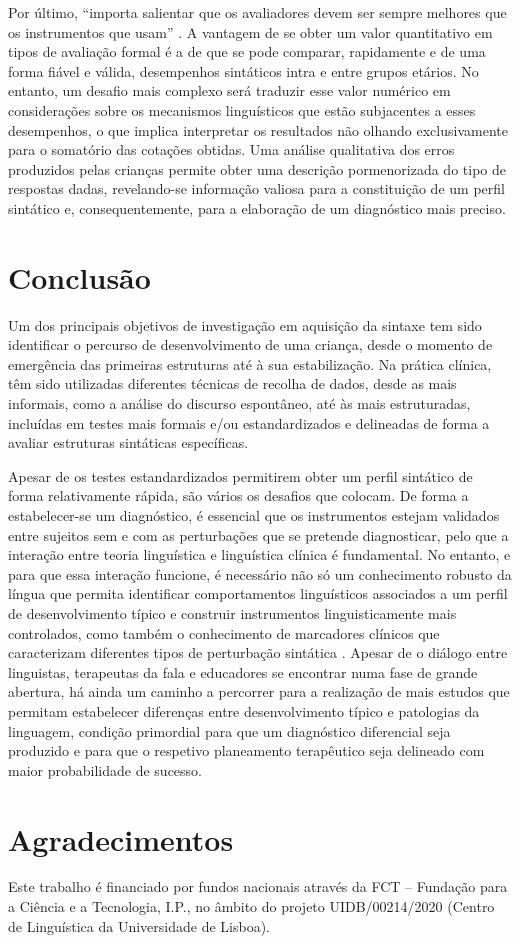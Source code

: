 \documentclass[output=paper,colorlinks,citecolor=brown,booklanguage=portuguese]{langscibook}
\begin{document}
Por último, “importa salientar que os avaliadores devem ser sempre melhores que os instrumentos que usam” \citep[215]{Almeida2008}. A vantagem de se obter um valor quantitativo em tipos de avaliação formal é a de que se pode comparar, rapidamente e de uma forma fiável e válida, desempenhos sintáticos intra e entre grupos etários. No entanto, um desafio mais complexo será traduzir esse valor numérico em considerações sobre os mecanismos linguísticos que estão subjacentes a esses desempenhos, o que implica interpretar os resultados não olhando exclusivamente para o somatório das cotações obtidas. Uma análise qualitativa dos erros produzidos pelas crianças permite obter uma descrição pormenorizada do tipo de respostas dadas, revelando-se informação valiosa para a constituição de um perfil sintático e, consequentemente, para a elaboração de um diagnóstico mais preciso.

\section{Conclusão}
Um dos principais objetivos de investigação em aquisição da sintaxe tem sido identificar o percurso de desenvolvimento de uma criança, desde o momento de emergência das primeiras estruturas até à sua estabilização. Na prática clínica, têm sido utilizadas diferentes técnicas de recolha de dados, desde as mais informais, como a análise do discurso espontâneo, até às mais estruturadas, incluídas em testes mais formais e/ou estandardizados e delineadas de forma a avaliar estruturas sintáticas específicas. 

Apesar de os testes estandardizados permitirem obter um perfil sintático de forma relativamente rápida, são vários os desafios que colocam. De forma a estabe\-lecer-se um diagnóstico, é essencial que os instrumentos estejam validados entre sujeitos sem e com as perturbações que se pretende diagnosticar, pelo que a interação entre teoria linguística e linguística clínica é fundamental. No entanto, e para que essa interação funcione, é necessário não só um conhecimento robusto da língua que permita identificar comportamentos linguísticos associados a um perfil de desenvolvimento típico e construir instrumentos linguisticamente mais controlados, como também o conhecimento de marcadores clínicos que caracterizam diferentes tipos de perturbação sintática \citep{Costa2016}. Apesar de o diálogo entre linguistas, terapeutas da fala e educadores se encontrar numa fase de grande abertura, há ainda um caminho a percorrer para a realização de mais estudos que permitam estabelecer diferenças entre desenvolvimento típico e patologias da linguagem, condição primordial para que um diagnóstico diferencial seja produzido e para que o respetivo planeamento terapêutico seja delineado com maior probabilidade de sucesso.


\section*{Agradecimentos}
Este trabalho é financiado por fundos nacionais através da FCT – Fundação para a Ciência e a Tecnologia, I.P., no âmbito do projeto UIDB/00214/2020 (Centro de Linguística da Universidade de Lisboa).



{\sloppy\printbibliography[heading=subbibliography,notkeyword=this]}
\end{document}
